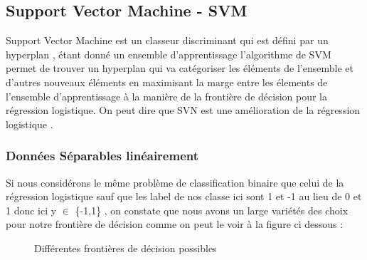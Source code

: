\subsection{Support Vector Machine - SVM \cite{SVm1} }
Support Vector Machine est un classeur discriminant qui est défini par un hyperplan , étant donné un ensemble d'apprentissage l'algorithme de SVM permet de trouver un hyperplan qui va catégoriser les éléments de l'ensemble et d'autres nouveaux éléments en maximisant la marge entre les élements de l'ensemble d'apprentissage  à la manière de la frontière de décision pour la régression logistique. On peut dire que SVN est une amélioration de la régression logistique .
\subsubsection{Données Séparables linéairement }
Si nous considérons le même problème de classification binaire que celui de la régression logistique sauf que les label de nos classe ici sont 1 et -1 au lieu de 0 et 1 donc ici y $\in$ \{-1,1\} , on constate que nous avons un large variétés des choix pour notre frontière de décision  comme on peut le voir à la figure ci dessous :
\begin{figure}[ht]
	\centering
	\hfill
	\hfill
	\caption{Différentes frontières de décision possibles }
\end{figure}
